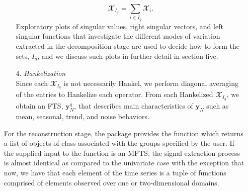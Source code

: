 \begin{itemize}
\begin{itemize}
	\begin{equation}
		\mathbfcal{X}_{I_{q}} = \sum_{i \in I_{q}} \mathbfcal{X}_{i}. \nonumber
	\end{equation}
Exploratory plots of singular values, right singular vectors, and left singular functions that investigate the different modes of variation extracted in the decomposition stage are used to decide how to form the sets, $I_{q}$, and we discuss such plots in further detail in section five.
\item[4.] \textit{Hankelization }\\ Since each $\mathbfcal{X}_{I_{q}}$ is not necessarily Hankel, we perform diagonal averaging of the entries to Hankelize each operator. From each Hankelized $\mathbfcal{X}_{I_{q}}$, we obtain an FTS, $\mathbf{y}_{N}^{q}$, that describes main characteristics of $\mathbf{y}_{N}$ such as mean, seasonal, trend, and noise behaviors.
\end{itemize}
For the reconstruction stage, the  package provides the function  which returns a list of objects of class  associated with the groups specified by the user. If the supplied input to the  function is an MFTS, the signal extraction process is almost identical as compared to the univariate case with the exception that now, we have that each element of the time series is a tuple of functions comprised of elements observed over one or two-dimensional domains.
\end{itemize}
